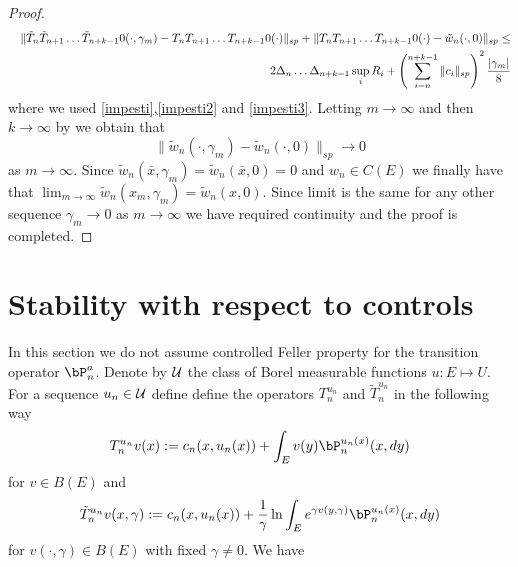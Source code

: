 \documentclass[10pt,english]{extarticle}
\begin{document}
\begin{proof}
\begin{eqnarray}
&&\|\tilde{T}_n\tilde{T}_{n+1}\ldots \tilde{T}_{n+k-1}0(\cdot,\gamma_m)-{T}_n{T}_{n+1}\ldots {T}_{n+k-1}0(\cdot)\|_{sp} +\|{T}_n{T}_{n+1}\ldots {T}_{n+k-1}0(\cdot)-\tilde{w}_n(\cdot,0)\|_{sp}\leq \nonumber \\
&& 2\Delta_n\ldots \Delta_{n+k-1}\sup_i R_i +  \left(\sum_{i=n}^{n+k-1}\|c_i\|_{sp}\right)^2 {|\gamma_m| \over 8}
\end{eqnarray}
where we  used \eqref{impesti},\eqref{impesti2} and \eqref{impesti3}. Letting $m\to \infty$ and then $k\to \infty$ by we obtain that
\begin{equation}
\|\tilde{w}_n(\cdot,\gamma_m)-\tilde{w}_n(\cdot,0)\|_{sp}\to 0
\end{equation}
as $m\to \infty$. Since $\tilde{w}_n(\bar{x},\gamma_m)=\tilde{w}_n(\bar{x},0)=0$ and $w_n\in C(E)$ we finally have that  $\lim_{m\to \infty}\tilde{w}_n(x_m,\gamma_m)=\tilde{w}_n(x,0)$. Since limit is the same for any other sequence $\gamma_m \to 0$ as $m\to \infty$ we have required continuity  and the proof is completed.
\end{proof}

\section{Stability with respect to controls}
In this section we do not assume controlled Feller property for the transition operator $\bP_n^a$.   Denote by ${\cal U}$ the class of Borel measurable functions $u:E \mapsto U$. For a sequence $u_n\in {\cal U}$ define define the operators $T_n^{u_n}$ and $\tilde{T}_n^{u_n}$ in the following way
 \begin{equation}\label{opTc}
T_n^{u_n}v(x) := c_n(x,u_n(x))+\int_E v(y)\bP_n^{u_n(x)}(x,dy)
\end{equation}
for $v\in B(E)$ and
\begin{equation}\label{Optrc}
\tilde{T}_n^{u_n} v(x,\gamma):= c_n(x,u_n(x))+{1\over \gamma}\ln\int_E e^{\gamma v(y,\gamma)}\bP_n^{u_n(x)}(x,dy)
\end{equation}
for $v(\cdot,\gamma)\in B(E)$ with fixed $\gamma\neq 0$. We have
\end{document}
